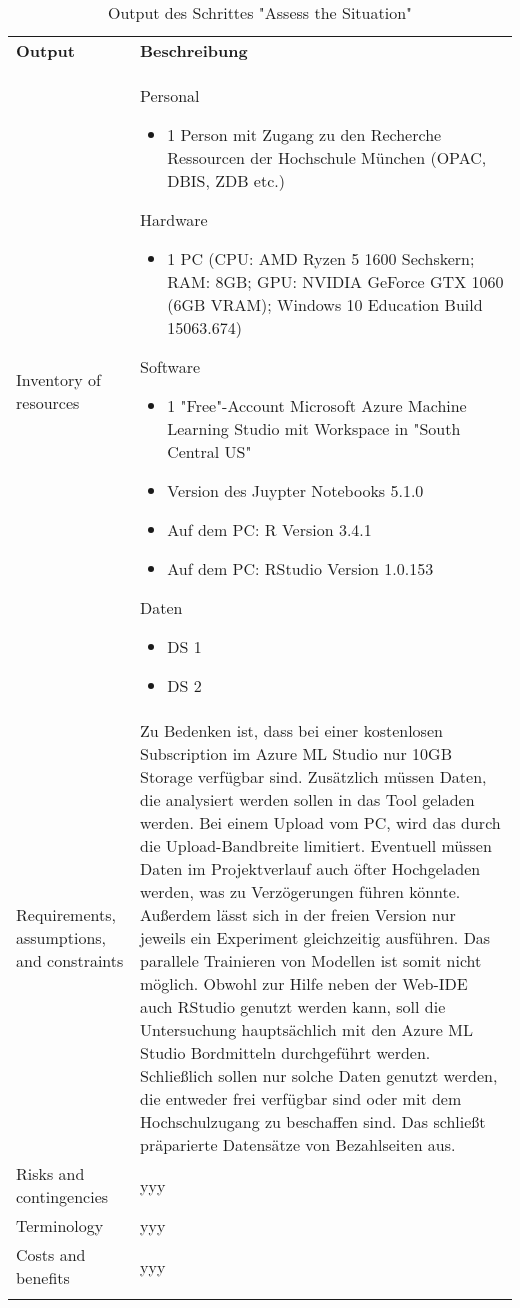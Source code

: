 \begin{longtable}[H]{|p{}|p{10cm}|}
\hline
\textbf{Output} & \textbf{Beschreibung} \\ 
\hhline{==}
Inventory of resources & Personal
\begin{itemize}
\item 1 Person mit Zugang zu den Recherche Ressourcen der Hochschule München (OPAC, DBIS, ZDB etc.\citep{noauthor_hochschule_2017})
\end{itemize}
Hardware
\begin{itemize}
\item 1 PC (CPU: AMD Ryzen 5 1600 Sechskern; RAM: 8GB; GPU: NVIDIA GeForce GTX 1060 (6GB VRAM); Windows 10 Education Build 15063.674)
\end{itemize}
Software
\begin{itemize}
\item 1 "Free"-Account Microsoft Azure Machine Learning Studio mit Workspace in "South Central US"
\item Version des Juypter Notebooks 5.1.0
\item Auf dem PC: R Version 3.4.1
\item Auf dem PC: RStudio Version 1.0.153
\end{itemize}
Daten
\begin{itemize}
\item DS 1
\item DS 2
\end{itemize}
\\
\hline
Requirements, assumptions, and constraints &  Zu Bedenken ist, dass bei einer kostenlosen Subscription im Azure ML Studio nur 10GB Storage verfügbar sind. Zusätzlich müssen Daten, die analysiert werden sollen in das Tool geladen werden. Bei einem Upload vom PC, wird das durch die Upload-Bandbreite limitiert. Eventuell müssen Daten im Projektverlauf auch öfter Hochgeladen werden, was zu Verzögerungen führen könnte. Außerdem lässt sich in der freien Version nur jeweils ein Experiment gleichzeitig ausführen. Das parallele Trainieren von Modellen ist somit nicht möglich.\newline 
Obwohl zur Hilfe neben der Web-IDE auch RStudio genutzt werden kann, soll die Untersuchung hauptsächlich mit den Azure ML Studio Bordmitteln durchgeführt werden.\newline
Schließlich sollen nur solche Daten genutzt werden, die entweder frei verfügbar sind oder mit dem Hochschulzugang zu beschaffen sind. Das schließt präparierte Datensätze von Bezahlseiten aus.\\
\hline
Risks and contingencies & yyy \\
\hline
Terminology & yyy \\
\hline
Costs and benefits & yyy \\
\hline
\caption{Output des Schrittes "Assess the Situation"}
\end{longtable}



